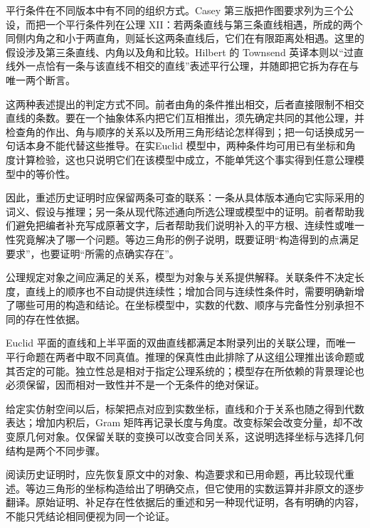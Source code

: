 平行条件在不同版本中有不同的组织方式。Casey 第三版把作图要求列为三个公设，而把一个平行条件列在公理 XII：若两条直线与第三条直线相遇，所成的两个同侧内角之和小于两直角，则延长这两条直线后，它们在有限距离处相遇。\cite[第一卷，公理 XII]{Casey1885Euclid}这里的假设涉及第三条直线、内角以及角和比较。Hilbert 的 Townsend 英译本则以“过直线外一点恰有一条与该直线不相交的直线”表述平行公理，并随即把它拆为存在与唯一两个断言。\cite[第I章第5节]{Hilbert1950Foundations}

\ProseParagraphBreak

这两种表述提出的判定方式不同。前者由角的条件推出相交，后者直接限制不相交直线的条数。要在一个抽象体系内把它们互相推出，须先确定共同的其他公理，并检查角的作出、角与顺序的关系以及所用三角形结论怎样得到；把一句话换成另一句话本身不能代替这些推导。在实Euclid 模型中，两种条件均可用已有坐标和角度计算检验，这也只说明它们在该模型中成立，不能单凭这个事实得到任意公理模型中的等价性。

\ProseParagraphBreak

因此，重述历史证明时应保留两条可查的联系：一条从具体版本通向它实际采用的词义、假设与推理；另一条从现代陈述通向所选公理或模型中的证明。前者帮助我们避免把编者补充写成原著文字，后者帮助我们说明补入的平方根、连续性或唯一性究竟解决了哪一个问题。等边三角形的例子说明，既要证明“构造得到的点满足要求”，也要证明“所需的点确实存在”。

\begin{chaptersummary}
	公理规定对象之间应满足的关系，模型为对象与关系提供解释。关联条件不决定长度，直线上的顺序也不自动提供连续性；增加合同与连续性条件时，需要明确新增了哪些可用的构造和结论。在坐标模型中，实数的代数、顺序与完备性分别承担不同的存在性依据。

	\ProseParagraphBreak

	Euclid 平面的直线和上半平面的双曲直线都满足本附录列出的关联公理，而唯一平行命题在两者中取不同真值。推理的保真性由此排除了从这组公理推出该命题或其否定的可能。独立性总是相对于指定公理系统的；模型存在所依赖的背景理论也必须保留，因而相对一致性并不是一个无条件的绝对保证。

	\ProseParagraphBreak

	给定实仿射空间以后，标架把点对应到实数坐标，直线和介于关系也随之得到代数表达；增加内积后，Gram 矩阵再记录长度与角度。改变标架会改变分量，却不改变原几何对象。仅保留关联的变换可以改变合同关系，这说明选择坐标与选择几何结构是两个不同步骤。

	\ProseParagraphBreak

	阅读历史证明时，应先恢复原文中的对象、构造要求和已用命题，再比较现代重述。等边三角形的坐标构造给出了明确交点，但它使用的实数运算并非原文的逐步翻译。原始证明、补足存在性依据后的重述和另一种现代证明，各有明确的内容，不能只凭结论相同便视为同一个论证。
\end{chaptersummary}

